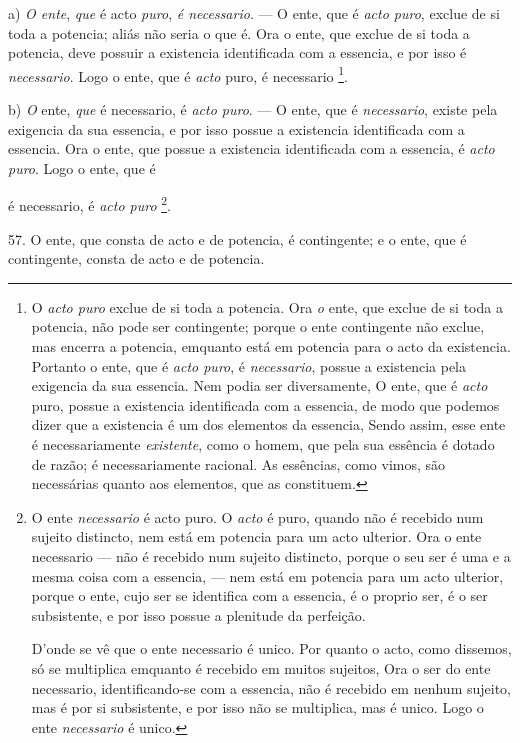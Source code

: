 a) \emph{O ente}, \emph{que} é acto \emph{puro}, \emph{é necessario}. --- O ente, que é \emph{acto puro}, exclue de si toda a potencia; aliás não seria o que é. Ora o ente, que exclue de si toda a potencia, deve possuir a existencia identificada com a essencia, e por isso é \emph{necessario}. Logo o ente, que é \emph{acto} puro, é necessario \footnote{O \emph{acto puro} exclue de si toda a potencia. Ora \emph{o} ente, que exclue de si toda a potencia, não pode ser contingente; porque o ente contingente não exclue, mas encerra a potencia, emquanto está em potencia para o acto da existencia. Portanto o ente, que é \emph{acto puro}, é \emph{necessario}, possue a existencia pela exigencia da sua essencia. Nem podia ser diversamente, O ente, que é \emph{acto} puro, possue a existencia identificada com a essencia, de modo que podemos dizer que a existencia é um dos elementos da essencia, Sendo assim, esse ente é necessariamente \emph{existente}, como o homem, que pela sua essência é dotado de razão; é necessariamente racional. As essências, como vimos, são necessárias quanto aos elementos, que as constituem.}.

b) \emph{O} ente, \emph{que} é necessario, é \emph{acto puro}. --- O ente, que é \emph{necessario}, existe pela exigencia da sua essencia, e por isso possue a existencia identificada com a essencia. Ora o ente, que possue a existencia identificada com a essencia, é \emph{acto puro}. Logo o ente, que é

é necessario, é \emph{acto puro} \footnote{O ente \emph{necessario} é acto puro. O \emph{acto} é puro, quando não é recebido num sujeito distincto, nem está em potencia para um acto ulterior. Ora o ente necessario --- não é recebido num sujeito distincto, porque o seu ser é uma e a mesma coisa com a essencia, --- nem está em potencia para um acto ulterior, porque o ente, cujo ser se identifica com a essencia, é o proprio ser, é o ser subsistente, e por isso possue a plenitude da perfeição.\par D'onde se vê que o ente necessario é unico. Por quanto o acto, como dissemos, só se multiplica emquanto é recebido em muitos sujeitos, Ora o ser do ente necessario, identificando-se com a essencia, não é recebido em nenhum sujeito, mas é por si subsistente, e por isso não se multiplica, mas é unico. Logo o ente \emph{necessario} é unico.}.

57. O ente, que consta de acto e de potencia, é contingente; e o ente, que é contingente, consta de acto e de potencia.

